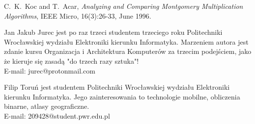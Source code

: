\documentclass[10pt,journal,compsoc]{IEEEtran}
\begin{document}
\begin{thebibliography}{1}

C.~K.~Koc and T.~Acar, \emph{Analyzing and Comparing Montgomery Multiplication Algorithms}, IEEE Micro, 16(3):26-33, June 1996.

\end{thebibliography}
\begin{IEEEbiography}{Jan Jakub Jurec} jest po raz trzeci studentem trzeciego roku Politechniki Wrocławskiej wydziału Elektroniki kierunku Informatyka. Marzeniem autora jest zdanie kursu Organizacja i Architektura Komputerów za trzecim podejściem, jako że kieruje się zasadą "do trzech razy sztuka"! \\
E-mail: jurec@protonmail.com
\end{IEEEbiography}


\begin{IEEEbiography}{Filip Toruń}
jest studentem Politechniki Wrocławskiej wydziału Elektroniki kierunku Informatyka. Jego zainteresowania to technologie mobilne, obliczenia binarne, atlasy geograficzne.\\
E-mail: 209428@student.pwr.edu.pl
\end{IEEEbiography}

\vfill
\end{document}
